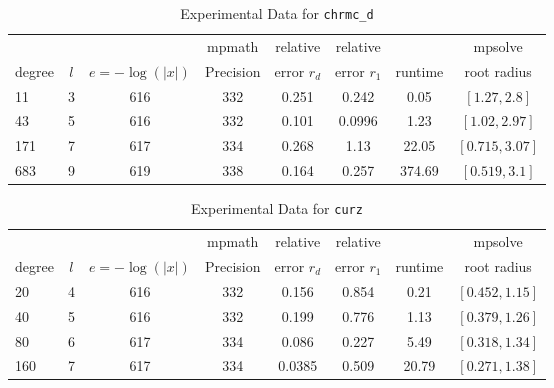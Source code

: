 \documentclass[sigconf]{acmart}
\begin{document}
\begin{table}[t]
\caption{Experimental Data for \texttt{chrmc\_d}} %
\label{tab:chrmc_d}
\vskip -0.15in
\begin{center}
\begin{small}
\begin{sc}
\begin{tabular}{lccccccc}
\toprule
&  &  & mpmath & relative  & relative &  & mpsolve \\
degree  & $l$& $e=-\log(|x|)$& Precision &error $r_d$       & error $r_1$ &runtime& root radius\\
\midrule
11 & 3 & 616 & 332 & 0.251 & 0.242 & 0.05 & $[1.27, 2.8]$\\
 43 & 5 & 616 & 332 & 0.101 & 0.0996 & 1.23 & $[1.02, 2.97]$\\
 171 & 7 & 617 & 334 & 0.268 & 1.13 & 22.05 & $[0.715, 3.07]$\\
 683 & 9 & 619 & 338 & 0.164 & 0.257 & 374.69 & $[0.519, 3.1]$\\
\bottomrule
\end{tabular}
\end{sc}
\end{small}
\end{center}
\vskip 0.05in
\end{table}


\begin{table}[t]
\caption{Experimental Data for \texttt{curz}} %
\label{tab:curz}
\vskip -0.15in
\begin{center}
\begin{small}
\begin{sc}
\begin{tabular}{lccccccc}
\toprule
             &       &                       & mpmath   & relative       & relative       &               & mpsolve \\
degree  & $l$ & $e=-\log(|x|)$ & Precision & error $r_d$ & error $r_1$ & runtime & root radius\\
\midrule
 20 & 4 & 616 & 332 & 0.156 & 0.854 & 0.21 & $[0.452, 1.15]$\\
 40 & 5 & 616 & 332 & 0.199 & 0.776 & 1.13 & $[0.379, 1.26]$\\
 80 & 6 & 617 & 334 & 0.086 & 0.227 & 5.49 & $[0.318, 1.34]$\\
 160 & 7 & 617 & 334 & 0.0385 & 0.509 & 20.79 & $[0.271, 1.38]$\\
\bottomrule
\end{tabular}
\end{sc}
\end{small}
\end{center}
\vskip 0.05in
\end{table}
\end{document}
